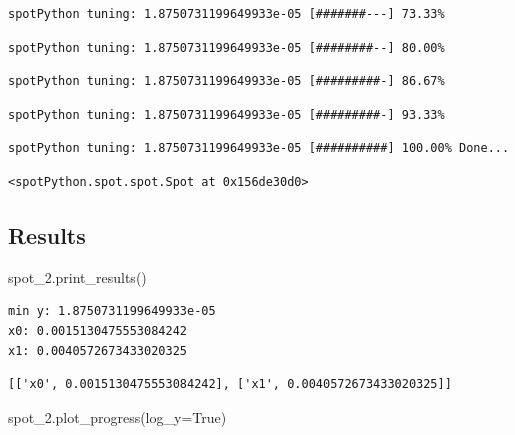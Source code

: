 \documentclass[
  letterpaper,
  DIV=11,
  numbers=noendperiod]{scrreprt}
\newenvironment{Shaded}{\begin{snugshade}}{\end{snugshade}}
\newcommand{\NormalTok}[1]{\textcolor[rgb]{0.00,0.23,0.31}{#1}}
\newcommand{\OperatorTok}[1]{\textcolor[rgb]{0.37,0.37,0.37}{#1}}
\newcommand{\VariableTok}[1]{\textcolor[rgb]{0.07,0.07,0.07}{#1}}
\begin{document}
\begin{verbatim}
spotPython tuning: 1.8750731199649933e-05 [#######---] 73.33% 
\end{verbatim}

\begin{verbatim}
spotPython tuning: 1.8750731199649933e-05 [########--] 80.00% 
\end{verbatim}

\begin{verbatim}
spotPython tuning: 1.8750731199649933e-05 [#########-] 86.67% 
\end{verbatim}

\begin{verbatim}
spotPython tuning: 1.8750731199649933e-05 [#########-] 93.33% 
\end{verbatim}

\begin{verbatim}
spotPython tuning: 1.8750731199649933e-05 [##########] 100.00% Done...
\end{verbatim}

\begin{verbatim}
<spotPython.spot.spot.Spot at 0x156de30d0>
\end{verbatim}

\hypertarget{results-1}{%
\subsection{Results}\label{results-1}}

\begin{Shaded}
\begin{Highlighting}[]
\NormalTok{spot\_2.print\_results()}
\end{Highlighting}
\end{Shaded}

\begin{verbatim}
min y: 1.8750731199649933e-05
x0: 0.0015130475553084242
x1: 0.0040572673433020325
\end{verbatim}

\begin{verbatim}
[['x0', 0.0015130475553084242], ['x1', 0.0040572673433020325]]
\end{verbatim}

\begin{Shaded}
\begin{Highlighting}[]
\NormalTok{spot\_2.plot\_progress(log\_y}\OperatorTok{=}\VariableTok{True}\NormalTok{)}
\end{Highlighting}
\end{Shaded}
\end{document}
